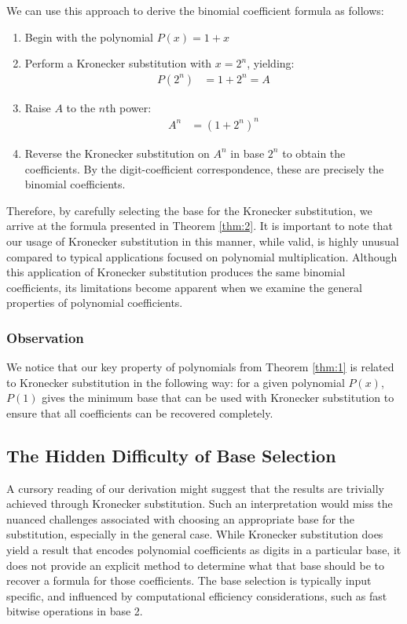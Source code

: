 \documentclass{article}
\theoremstyle{plain}
\theoremstyle{definition}
\begin{document}
We can use this approach to derive the binomial coefficient formula as follows:
\begin{enumerate}
    \item Begin with the polynomial $P(x) = 1 + x$
    \item Perform a Kronecker substitution with $x = 2^{n}$, yielding:
    \begin{align}
    P(2^{n}) &= 1 + 2^{n} = A
    \end{align}
    \item Raise $A$ to the $n$th power:
    \begin{align}
    A^n &= (1 + 2^n)^n
    \end{align}
    \item Reverse the Kronecker substitution on $A^n$ in base $2^n$ to obtain the coefficients. By the digit-coefficient correspondence, these are precisely the binomial coefficients.
\end{enumerate}
Therefore, by carefully selecting the base for the Kronecker substitution, we arrive at the formula presented in Theorem \ref{thm:2}. It is important to note that our usage of Kronecker substitution in this manner, while valid, is highly unusual compared to typical applications focused on polynomial multiplication. Although this application of Kronecker substitution produces the same binomial coefficients, its limitations become apparent when we examine the general properties of polynomial coefficients.

\subsubsection{Observation}
We notice that our key property of polynomials from Theorem \ref{thm:1} is related to Kronecker substitution in the following way: for a given polynomial $P(x)$, $P(1)$ gives the minimum base that can be used with Kronecker substitution to ensure that all coefficients can be recovered completely.

\subsection{The Hidden Difficulty of Base Selection}
A cursory reading of our derivation might suggest that the results are trivially achieved through Kronecker substitution. Such an interpretation would miss the nuanced challenges associated with choosing an appropriate base for the substitution, especially in the general case. While Kronecker substitution does yield a result that encodes polynomial coefficients as digits in a particular base, it does not provide an explicit method to determine what that base should be to recover a formula for those coefficients. The base selection is typically input specific, and influenced by computational efficiency considerations, such as fast bitwise operations in base 2.
\end{document}
